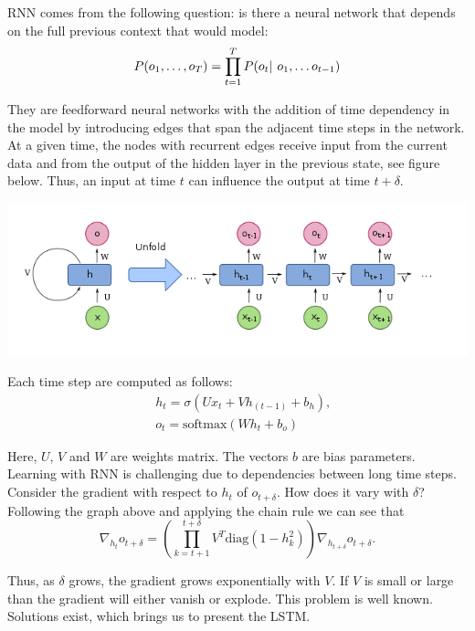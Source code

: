 \documentclass[landscape,a0paper,fontscale=0.34]{baposter}
\begin{document}
\begin{poster}
{
\begin{multicols}{2}
RNN comes from the following question: is there a neural network that depends
on the full previous context that would model: \begin{align*}
    P(o_1, \dots , o_T) = \prod_{t = 1}^T P(o_t | \hspace{0.05in} o_1, \ldots o_{t-1})
\end{align*}

They are feedforward neural networks with the addition of time dependency in
the model by introducing edges that span the adjacent time steps in the
network. At a given time, the nodes with recurrent edges receive input from the
current data and from the output of the hidden layer in the previous state, see
figure below. Thus, an input at time $t$ can influence the output at time $t + \delta$.
\begin{center}
    \includegraphics[width = 0.9\linewidth]{RNN.png}
\end{center}

Each time step are computed as follows:
\begin{align*}
    &h_t = \sigma(U x_t + V h_{(t-1)} + b_h)\text{,}\\
    &o_t = \text{softmax}(W h_t + b_o)
\end{align*}

Here, $ U$, $V$ and $W$ are weights matrix. The vectors $b$ are bias
parameters. Learning with RNN is challenging due to dependencies between long
time steps. Consider the gradient with respect to $h_t$ of $o_{t + \delta}$.
How does it vary with $\delta$? Following the graph above and applying the
chain rule we can see that
\begin{equation*}
  \nabla_{h_t} o_{t + \delta} = \left( \prod_{k = t+1}^{t+\delta} V^T
  \text{diag}(1 - h^2_k) \right)\nabla_{h_{t + \delta}}o_{t + \delta}.
\end{equation*}

Thus, as $\delta$ grows, the gradient grows exponentially with $V$. If $V$ is
small or large than the gradient will either vanish or explode. This problem is
well known. Solutions exist, which brings us to present the LSTM.
\end{multicols}
}


\end{poster}
\end{document}
